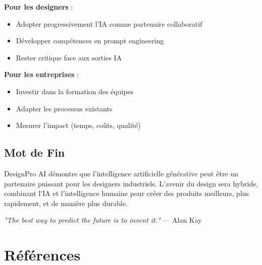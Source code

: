 \documentclass[12pt,a4paper]{article}
\begin{document}
\textbf{Pour les designers} :
\begin{itemize}
    \item Adopter progressivement l'IA comme partenaire collaboratif
    \item Développer compétences en prompt engineering
    \item Rester critique face aux sorties IA
\end{itemize}

\textbf{Pour les entreprises} :
\begin{itemize}
    \item Investir dans la formation des équipes
    \item Adapter les processus existants
    \item Mesurer l'impact (temps, coûts, qualité)
\end{itemize}

\subsection{Mot de Fin}

DesignPro AI démontre que l'intelligence artificielle générative peut être un partenaire puissant pour les designers industriels. L'avenir du design sera hybride, combinant l'IA et l'intelligence humaine pour créer des produits meilleurs, plus rapidement, et de manière plus durable.

\vspace{1cm}
\begin{center}
\textit{"The best way to predict the future is to invent it."} — Alan Kay
\end{center}

\newpage
\section*{Références}
\end{document}
